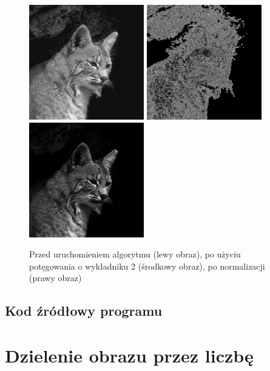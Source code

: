 \documentclass[a4paper,12pt]{book}
\begin{document}
\begin{figure}[H]
	\caption{Przed uruchomieniem algorytmu (lewy obraz), po użyciu potęgowania o wykładniku 2 (środkowy obraz), po normalizacji (prawy obraz)}
	\includegraphics[width=5cm, height=5cm]{cat-unmodified.jpg}
	\includegraphics[width=5cm, height=5cm]{2-4/power-gray-cat-20.png}
	\includegraphics[width=5cm, height=5cm]{2-4/power-gray-cat-20-norm.png}
\end{figure}

\subsection*{Kod źródłowy programu}

\section{Dzielenie obrazu przez liczbę}
\end{document}
